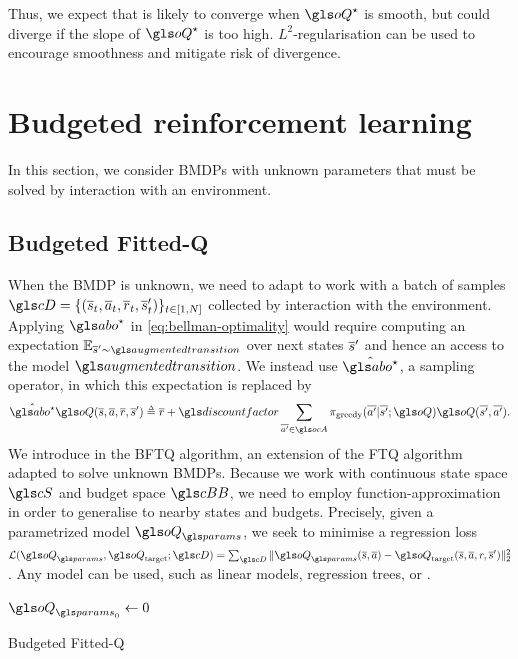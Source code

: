 Thus, we expect that  is likely to converge when $\oQ^{\star}$ is smooth, but could diverge if the slope of $\oQ^{\star}$ is too high.  $L^2$-regularisation can be used to encourage smoothness and mitigate risk of divergence.


\section{Budgeted reinforcement learning}

\label{sec:brl}

In this section, we consider \glspl{BMDP} with unknown parameters that must be solved by interaction with an environment. 

\subsection{Budgeted Fitted-Q}
\label{subsec:bftq}

When the \gls{BMDP} is unknown, we need to adapt  to work with a batch of samples $\cD=\{(\os_t,\oa_t,\overline{r}_t,\os_t')\}_{t\in [1,N]}$ collected by interaction with the environment. Applying $\abo^{\star}$ in \eqref{eq:bellman-optimality} would require computing an expectation $\expectedvalue_{\os'\sim \augmentedtransition}$ over next states $\overline{s}'$ and hence an access to the model $\augmentedtransition$. We instead use $\hat{\abo^{\star}}$, a sampling operator, in which this expectation is replaced by
\begin{equation*}
\hat{\abo^{\star}} \oQ(\os, \oa, \overline{r}, \os') \eqdef \overline{r} + \discount \sum_{\ov{a'}\in \ocA} \pi_\text{greedy}(\ov{a'}|\ov{s'}; \oQ) \oQ(\ov{s'}, \ov{a'}).
\end{equation*}
We introduce in  the \gls{BFTQ} algorithm, an extension of the \gls{FTQ} algorithm adapted to solve unknown \glspl{BMDP}. Because we work with continuous state space $\cS$ and budget space $\budgetspace$, we need to employ function-approximation in order to generalise to nearby states and budgets. Precisely, given a parametrized model $\oQ_\params$, we seek to minimise a regression loss $\cL(\oQ_\params, \oQ_\text{target};\cD) = \sum_{\cD} \|\oQ_\params(\os, \oa) - \oQ_\text{target}(\os, \oa, r, \os')\|_2^2$.
Any model can be used, such as linear models, regression trees, or .

\begin{algorithm}[ht]
	\DontPrintSemicolon
	\KwData{$\cD$}
	$\oQ_{\params_0} \leftarrow 0$\;
	\caption{Budgeted Fitted-Q}
	\label{alg:bftq}
\end{algorithm}

